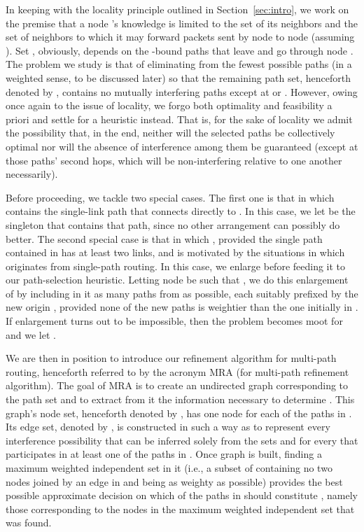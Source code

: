 \documentclass{article}
\begin{document}
In keeping with the locality principle outlined in Section~\ref{sec:intro}, we
work on the premise that a node 's knowledge is limited to the set  of
its neighbors and the set  of neighbors to
which it may forward packets sent by node  to node  (assuming ).
Set , obviously, depends on the -bound paths that leave
 and go through node . The problem we study is that of eliminating from
 the fewest possible paths (in a weighted sense, to be
discussed later) so that the remaining path set, henceforth denoted by
, contains no mutually interfering paths except at
 or . However, owing once again to the issue of locality, we forgo both
optimality and feasibility a priori and settle for a heuristic instead. That is,
for the sake of locality we admit the possibility that, in the end, neither will
the selected paths be collectively optimal nor will the absence of interference
among them be guaranteed (except at those paths' second hops, which will be
non-interfering relative to one another necessarily).

Before proceeding, we tackle two special cases. The first one is that in which
 contains the single-link path that connects  directly to
. In this case, we let  be the singleton that
contains that path, since no other arrangement can possibly do better. The
second special case is that in which , provided
the single path contained in  has at least two links, and is
motivated by the situations in which  originates from
single-path routing. In this case, we enlarge  before feeding
it to our path-selection heuristic. Letting node  be such that
, we do this enlargement of  by
including in it as many paths from  as possible, each suitably
prefixed by the new origin , provided none of the new paths is weightier than
the one initially in . If enlargement turns out to be
impossible, then the problem becomes moot for  and we let
.

We are then in position to introduce our refinement algorithm for multi-path
routing, henceforth referred to by the acronym MRA (for multi-path refinement
algorithm). The goal of MRA is to create an undirected graph 
corresponding to the path set  and to extract from it the
information necessary to determine . This graph's
node set, henceforth denoted by , has one node for each of the paths in
. Its edge set, denoted by , is constructed in such a way
as to represent every interference possibility that can be inferred solely from
the sets  and  for every  that participates
in at least one of the paths in . Once graph  is
built, finding a maximum weighted independent set in it (i.e., a subset of 
containing no two nodes joined by an edge in  and being as weighty as
possible) provides the best possible approximate decision on which of the paths
in  should constitute , namely
those corresponding to the nodes in the maximum weighted independent set that
was found.
\end{document}
